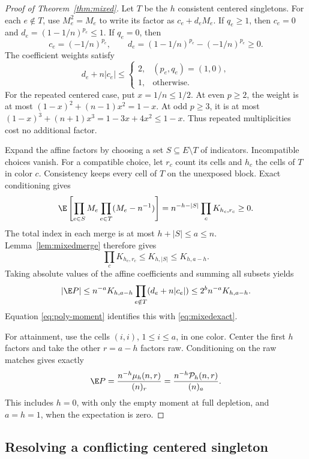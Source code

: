 \begin{proof}[Proof of Theorem~\ref{thm:mixed}]
Let $T$ be the $h$ consistent centered singletons. For each $e\notin T$, use $M_e^2=M_e$ to write its factor as $c_e+d_eM_e$. If $q_e\ge1$, then $c_e=0$ and $d_e=(1-1/n)^{p_e}\le1$. If $q_e=0$, then
\[
c_e=(-1/n)^{p_e},\qquad
d_e=(1-1/n)^{p_e}-(-1/n)^{p_e}\ge0.
\]
The coefficient weights satisfy
\begin{equation}\label{eq:weights}
d_e+n|c_e|\le
\begin{cases}
2,&(p_e,q_e)=(1,0),\\
1,&\text{otherwise}.
\end{cases}
\end{equation}
For the repeated centered case, put $x=1/n\le1/2$. At even $p\ge2$, the weight is at most
$(1-x)^2+(n-1)x^2=1-x$. At odd $p\ge3$, it is at most
$(1-x)^3+(n+1)x^3=1-3x+4x^2\le1-x$.
Thus repeated multiplicities cost no additional factor.

Expand the affine factors by choosing a set $S\subseteq E\setminus T$ of indicators. Incompatible choices vanish. For a compatible choice, let $r_c$ count its cells and $h_c$ the cells of $T$ in color $c$. Consistency keeps every cell of $T$ on the unexposed block. Exact conditioning gives
\begin{equation}\label{eq:prescribed}
\E\left[\prod_{e\in S}M_e
\prod_{e\in T}(M_e-n^{-1})\right]
=n^{-h-|S|}\prod_cK_{h_c,r_c}\ge0.
\end{equation}
The total index in each merge is at most $h+|S|\le a\le n$. Lemma~\ref{lem:mixedmerge} therefore gives
\[
\prod_cK_{h_c,r_c}\le K_{h,|S|}\le K_{h,a-h}.
\]
Taking absolute values of the affine coefficients and summing all subsets yields
\[
|\E P|\le n^{-a}K_{h,a-h}
\prod_{e\notin T}(d_e+n|c_e|)
\le 2^b n^{-a}K_{h,a-h}.
\]
Equation \eqref{eq:poly-moment} identifies this with \eqref{eq:mixedexact}.

For attainment, use the cells $(i,i)$, $1\le i\le a$, in one color. Center the first $h$ factors and take the other $r=a-h$ factors raw. Conditioning on the raw matches gives exactly
\[
\E P=\frac{n^{-h}\mu_h(n,r)}{(n)_r}
=\frac{n^{-h}\mathcal P_h(n,r)}{(n)_a}.
\]
This includes $h=0$, with only the empty moment at full depletion, and $a=h=1$, when the expectation is zero.
\end{proof}

\subsection{Resolving a conflicting centered singleton}

